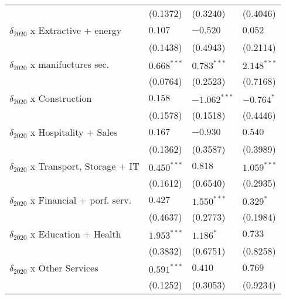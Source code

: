 \begin{table}[h!]
{{\begin{tabular}{llll}
                                                   &           (0.1372) &           (0.3240) &           (0.4046) \\
$\delta_{2020}$ x Extractive + energy              &            $0.107$ &           $-0.520$ &            $0.052$ \\
                                                   &           (0.1438) &           (0.4943) &           (0.2114) \\
$\delta_{2020}$ x manifuctures sec.                &      $0.668^{***}$ &      $0.783^{***}$ &      $2.148^{***}$ \\
                                                   &           (0.0764) &           (0.2523) &           (0.7168) \\
$\delta_{2020}$ x Construction                     &            $0.158$ &     $-1.062^{***}$ &         $-0.764^*$ \\
                                                   &           (0.1578) &           (0.1518) &           (0.4446) \\
$\delta_{2020}$ x Hospitality + Sales              &            $0.167$ &           $-0.930$ &            $0.540$ \\
                                                   &           (0.1362) &           (0.3587) &           (0.3989) \\
$\delta_{2020}$ x Transport, Storage + IT          &      $0.450^{***}$ &            $0.818$ &      $1.059^{***}$ \\
                                                   &           (0.1612) &           (0.6540) &           (0.2935) \\
$\delta_{2020}$ x Financial + porf. serv.          &            $0.427$ &      $1.550^{***}$ &          $0.329^*$ \\
                                                   &           (0.4637) &           (0.2773) &           (0.1984) \\
$\delta_{2020}$ x Education + Health               &      $1.953^{***}$ &          $1.186^*$ &            $0.733$ \\
                                                   &           (0.3832) &           (0.6751) &           (0.8258) \\
$\delta_{2020}$ x Other Services                   &      $0.591^{***}$ &            $0.410$ &            $0.769$ \\
                                                   &           (0.1252) &           (0.3053) &           (0.9234) \\

\end{tabular}}}
\end{table}
